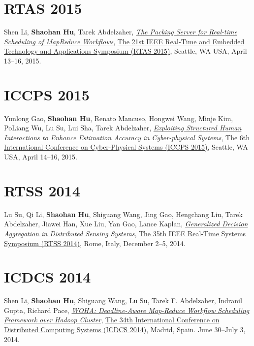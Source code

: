 \section{\sc RTAS 2015}\hypertarget{li2015rtas}{}
Shen Li, \textbf{Shaohan Hu}, Tarek Abdelzaher,
\href{http://ieeexplore.ieee.org/xpl/articleDetails.jsp?tp=&arnumber=7108416}{\emph{The Packing Server for Real-time Scheduling of MapReduce Workflows}},
\href{http://2015.rtas.org/}{\textsf{The 21st IEEE Real-Time and Embedded Technology and Applications Symposium (RTAS 2015)}},
Seattle, WA USA, April 13--16, 2015.

\section{\sc ICCPS 2015}\hypertarget{gao2015iccps}{}
Yunlong Gao, \textbf{Shaohan Hu}, Renato Mancuso, Hongwei Wang, Minje Kim, PoLiang Wu, Lu Su, Lui Sha, Tarek Abdelzaher,
\href{http://dl.acm.org/citation.cfm?id=2735960.2735965}{\emph{Exploiting Structured Human Interactions to Enhance Estimation Accuracy in Cyber-physical Systems}},
\href{http://iccps.acm.org/2015/}{\textsf{The 6th International Conference on Cyber-Physical Systems (ICCPS 2015)}},
Seattle, WA USA, April 14--16, 2015.

\section{\sc RTSS 2014}\hypertarget{su2014rtss}{}
Lu Su, Qi Li, \textbf{Shaohan Hu}, Shiguang Wang, Jing Gao, Hengchang Liu, Tarek Abdelzaher, Jiawei Han, Xue Liu, Yan Gao, Lance Kaplan,
\href{http://ieeexplore.ieee.org/xpl/articleDetails.jsp?arnumber=7010369}{\emph{Generalized Decision Aggregation in Distributed Sensing Systems}},
\href{http://2014.rtss.org/}{\textsf{The 35th IEEE Real-Time Systems Symposium (RTSS 2014)}},
Rome, Italy, December 2--5, 2014.

\section{\sc ICDCS 2014}\hypertarget{li2014icdcs}{}
Shen Li, \textbf{Shaohan Hu}, Shiguang Wang, Lu Su, Tarek F. Abdelzaher, Indranil Gupta, Richard Pace,
\href{http://ieeexplore.ieee.org/xpl/articleDetails.jsp?arnumber=6888886}{\emph{WOHA: Deadline-Aware Map-Reduce Workflow Scheduling Framework over Hadoop Cluster}},
\href{http://lsd.ls.fi.upm.es/icdcs2014}{\textsf{The 34th International Conference on Distributed Computing Systems (ICDCS 2014)}},
Madrid, Spain. June 30--July 3, 2014.

